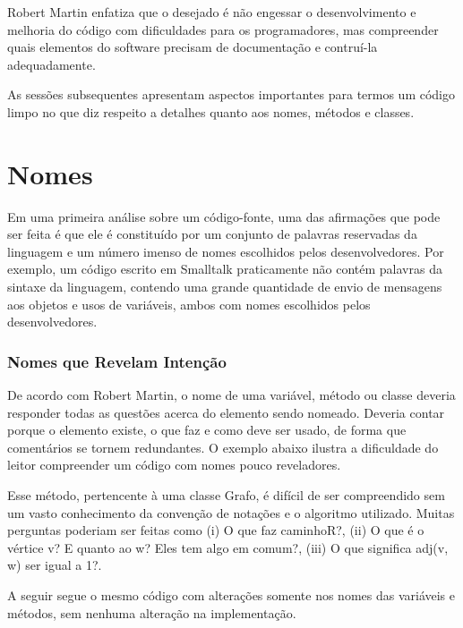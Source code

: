 Robert Martin enfatiza que o desejado é não engessar o desenvolvimento e melhoria do código com dificuldades para os programadores, mas compreender quais elementos do software precisam de documentação e contruí-la adequadamente.

\vskip 1.0cm
As sessões subsequentes apresentam aspectos importantes para termos um código limpo no que diz respeito a detalhes quanto aos nomes, métodos e classes.

\section{Nomes}
\label{sec:nomes}

Em uma primeira análise sobre um código-fonte, uma das afirmações que pode ser feita é que ele é constituído por um conjunto de palavras reservadas da linguagem e um número imenso de nomes escolhidos pelos desenvolvedores. Por exemplo, um código escrito em Smalltalk praticamente não contém palavras da sintaxe da linguagem, contendo uma grande quantidade de envio de mensagens aos objetos e usos de variáveis, ambos com nomes escolhidos pelos desenvolvedores.

\subsubsection{Nomes que Revelam Intenção}
De acordo com Robert Martin, o nome de uma variável, método ou classe deveria responder todas as questões acerca do elemento sendo nomeado. Deveria contar porque o elemento existe, o que faz e como deve ser usado, de forma que comentários se tornem redundantes. O exemplo abaixo ilustra a dificuldade do leitor compreender um código com nomes pouco reveladores.



Esse método, pertencente à uma classe Grafo, é difícil de ser compreendido sem um vasto conhecimento da convenção de notações e o algoritmo utilizado. Muitas perguntas poderiam ser feitas como (i) O que faz caminhoR?,  (ii) O que é o vértice v?  E quanto ao w? Eles tem algo em comum?, (iii)  O que significa adj(v, w) ser igual a 1?.

A seguir segue o mesmo código com alterações somente nos nomes das variáveis e métodos, sem nenhuma alteração na implementação.



